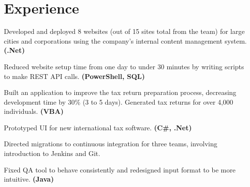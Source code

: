 \documentclass[letterpaper]{kevin-resume} %
\begin{document}
\hfill
%
%
\begin{minipage}[t]{0.66\textwidth} %


\section{Experience}

\vspace{\topsep} %
\begin{tightitemize}
	\item Developed and deployed 8 websites (out of 15 sites total from the team) for large cities and corporations using the company's internal content management system. \textbf{(.Net)}
	\item Reduced website setup time from one day to under 30 minutes by writing scripts to make REST API calls. \textbf{(PowerShell, SQL)}
\end{tightitemize}

\sectionspace %


\begin{tightitemize}
	\item Built an application to improve the tax return preparation process, decreasing development time by 30\% (3 to 5 days). Generated tax returns for over 4,000 individuals. \textbf{(VBA)}
	\item Prototyped UI for new international tax software. \textbf{(C\#, .Net)}
\end{tightitemize}

\sectionspace %


\begin{tightitemize}
	\item Directed migrations to continuous integration for three teams, involving introduction to Jenkins and Git.
	\item Fixed QA tool to behave consistently and redesigned input format to be more intuitive. \textbf{(Java)}
\end{tightitemize}


\end{minipage}
\end{document}

